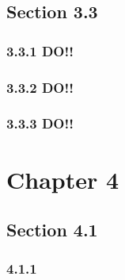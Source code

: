 \documentclass[12pt]{article}
\begin{document}
\subsection{Section 3.3}

\subsubsection{3.3.1 DO!!}

\subsubsection{3.3.2 DO!!}


\subsubsection{3.3.3 DO!!}


\section{Chapter 4}

\subsection{Section 4.1}

\subsubsection{4.1.1}
\end{document}
